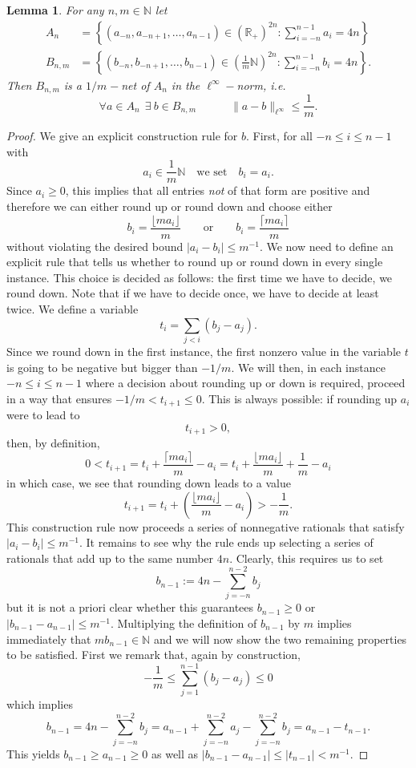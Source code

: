 \documentclass[10pt]{amsart}
\newtheorem{lemma}{Lemma}
\begin{document}
\begin{lemma} For any $n, m \in \mathbb{N}$ let
\begin{align*}
A_n &= \left\{(a_{-n}, a_{-n+1}, \dots, a_{n-1}) \in (\mathbb{R}_{+})^{2n}: \sum_{i=-n}^{n-1}{a_i} = 4n\right\}\\
B_{n,m} &= \left\{(b_{-n}, b_{-n+1}, \dots, b_{n-1}) \in \left(\frac{1}{m}\mathbb{N}\right)^{2n}: \sum_{i=-n}^{n-1}{b_i} = 4n\right\}.
\end{align*}
Then $B_{n,m}$ is a $1/m^{}-$net of $A_{n}$ in the $\ell^{\infty}-$norm, i.e.
$$ \forall a \in A_n~~\exists ~b \in B_{n,m} \qquad \quad \| a - b\|_{\ell^{\infty}} \leq \frac{1}{m}.$$
\end{lemma}
\begin{proof} We give an explicit construction rule for $b$. First, for all
$-n \leq i \leq n-1$ with 
$$a_i \in \frac{1}{m}\mathbb{N} \quad \mbox{we set} \quad b_i = a_i.$$
Since $a_i \geq 0$, this implies that all entries \textit{not} of that form are positive and therefore we can
either round up or round down and choose either
$$     b_i = \frac{\lfloor m a_i \rfloor}{m}    \qquad \mbox{or} \qquad    b_i = \frac{\lceil m a_i \rceil}{m}$$
without violating the desired bound $|a_i - b_i| \leq m^{-1}$.
We now need to define an explicit rule that tells us whether to round up or round down in every single
instance. This choice is decided as follows: the first time we have to decide, we round down. Note that if we have to
decide once, we have to decide at least twice. We define a variable
$$ t_{i} = \sum_{j < i}{(b_j - a_j)}.$$
Since we round down in the first instance, the first nonzero value in the variable $t$ is going to be negative but bigger
than $-1/m$.
We will then, in each instance $-n \leq i \leq n-1$ where a decision about rounding up or down is required,
proceed in a way that ensures $-1/m < t_{i+1} \leq 0$. This is always possible: if rounding up $a_i$ were to lead
to 
$$ t_{i+1} > 0,$$
then, by definition,
$$ 0 < t_{i+1} = t_{i} + \frac{\lceil m a_i \rceil}{m} - a_i =  t_{i} +\frac{\lfloor m a_i \rfloor}{m} + \frac{1}{m} - a_i$$
in which case, we see that rounding down leads to a value
$$ t_{i+1} =  t_{i} + \left( \frac{\lfloor m a_i \rfloor}{m} - a_i \right) > - \frac{1}{m}.$$
This construction rule now proceeds a series of nonnegative rationals that satisfy $|a_i - b_i| \leq m^{-1}$. It
remains to see why the rule ends up selecting a series of rationals that add up to the same number $4n$.
Clearly, this requires us to set
$$ b_{n-1} := 4n - \sum_{j=-n}^{n-2}{b_j}$$
but it is not a priori clear whether this guarantees $b_{n-1} \geq 0$ or $|b_{n-1} - a_{n-1}| \leq m^{-1}$. Multiplying the definition of $b_{n-1}$ by $m$ implies immediately that $m b_{n-1} \in \mathbb{N}$
and we will now show the two remaining properties to be satisfied.
First we remark that, again by construction,
$$ - \frac{1}{m} \leq  \sum_{j =1}^{n-1}{(b_j - a_j)} \leq 0$$
which implies
$$ b_{n-1} = 4n - \sum_{j=-n}^{n-2}{b_j} = a_{n-1} + \sum_{j=-n}^{n-2}{a_j}  -  \sum_{j=-n}^{n-2}{b_j}  = a_{n-1} - t_{n-1}.$$
This yields $b_{n-1} \geq a_{n-1} \geq 0$ as well as $|b_{n-1} - a_{n-1}| \leq |t_{n-1}| < m^{-1}$.
\end{proof}
\end{document}
